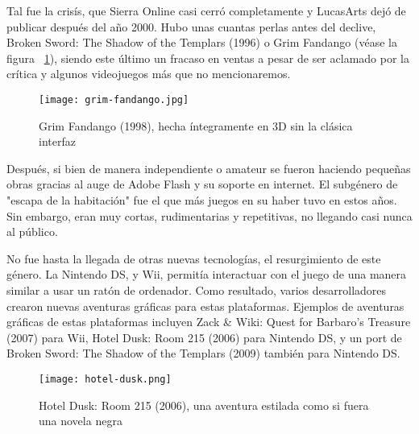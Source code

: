 Tal fue la crisís, que Sierra Online casi cerró completamente y LucasArts dejó de publicar después del año 2000. Hubo unas cuantas perlas antes del declive, Broken Sword: The Shadow of the Templars  (1996) o Grim Fandango  (véase la figura ~\ref{fig:grim-fandango}), siendo este último un fracaso en ventas a pesar de ser aclamado por la crítica y algunos videojuegos más que no mencionaremos.


\begin{figure}[H] 
  \begin{center}
    \texttt{[image: grim-fandango.jpg]}
  \end{center}
  \caption{Grim Fandango (1998), hecha íntegramente en 3D sin la clásica interfaz }
    \label{fig:grim-fandango}
\end{figure}

Después, si bien de manera independiente o amateur se fueron haciendo pequeñas obras gracias al auge de Adobe Flash y su soporte en internet. El subgénero de "escapa de la habitación" fue el que más juegos en su haber tuvo en estos años. Sin embargo, eran muy cortas, rudimentarias y repetitivas, no llegando casi nunca al público. 

No fue hasta la llegada de otras nuevas tecnologías, el resurgimiento de este género. La Nintendo DS, y Wii, permitía interactuar con el juego de una manera similar a usar un ratón de ordenador. Como resultado, varios desarrolladores crearon nuevas aventuras gráficas para estas plataformas. Ejemplos de aventuras gráficas de estas plataformas incluyen Zack \& Wiki: Quest for Barbaro's Treasure  (2007) para Wii, Hotel Dusk: Room 215  (2006) para Nintendo DS, y un port de Broken Sword: The Shadow of the Templars (2009) también para Nintendo DS. 

\begin{figure}[H] 
  \begin{center}
    \texttt{[image: hotel-dusk.png]}
  \end{center}
  \caption{Hotel Dusk: Room 215 (2006), una aventura estilada como si fuera una novela negra}
    \label{fig:hotel-dusk}
\end{figure}

